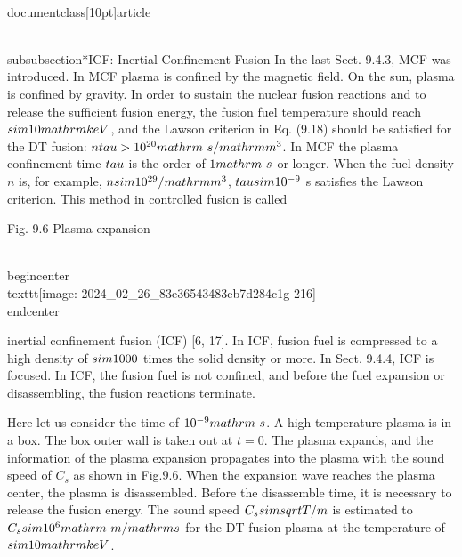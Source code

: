 \\documentclass[10pt]{article}
\begin{document}
{{{{{{\\subsubsection*{ICF: Inertial Confinement Fusion}
In the last Sect. 9.4.3, MCF was introduced. In MCF plasma is confined by the magnetic field. On the sun, plasma is confined by gravity. In order to sustain the nuclear fusion reactions and to release the sufficient fusion energy, the fusion fuel temperature should reach $\\sim 10 \\mathrm{keV}$, and the Lawson criterion in Eq. (9.18) should be satisfied for the DT fusion: $n \\tau>10^{20} \\mathrm{~s} / \\mathrm{m}^{3}$. In MCF the plasma confinement time $\\tau$ is the order of $1 \\mathrm{~s}$ or longer. When the fuel density $n$ is, for example, $n \\sim 10^{29} / \\mathrm{m}^{3}$, $\\tau \\sim 10^{-9}$ s satisfies the Lawson criterion. This method in controlled fusion is called

Fig. 9.6 Plasma expansion

\\begin{center}
\\texttt{[image: 2024\_02\_26\_83e36543483eb7d284c1g-216]}
\\end{center}

inertial confinement fusion (ICF) [6, 17]. In ICF, fusion fuel is compressed to a high density of $\\sim 1000$ times the solid density or more. In Sect. 9.4.4, ICF is focused. In ICF, the fusion fuel is not confined, and before the fuel expansion or disassembling, the fusion reactions terminate.

Here let us consider the time of $10^{-9} \\mathrm{~s}$. A high-temperature plasma is in a box. The box outer wall is taken out at $t=0$. The plasma expands, and the information of the plasma expansion propagates into the plasma with the sound speed of $C_{s}$ as shown in Fig.9.6. When the expansion wave reaches the plasma center, the plasma is disassembled. Before the disassemble time, it is necessary to release the fusion energy. The sound speed $C_{s} \\sim \\sqrt{T / m}$ is estimated to $C_{s} \\sim 10^{6} \\mathrm{~m} / \\mathrm{s}$ for the DT fusion plasma at the temperature of $\\sim 10 \\mathrm{keV}$.

}}}}}}
\end{document}
